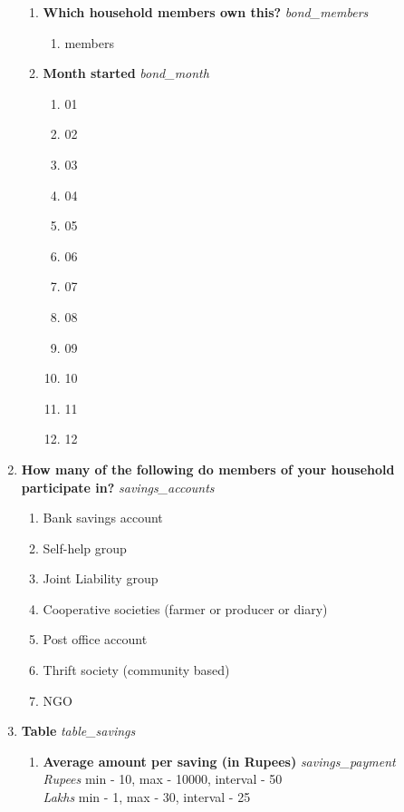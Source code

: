 \documentclass{article}
\begin{document}
\begin{enumerate}
\begin{enumerate}[label*=\arabic*.]
\item {\bfseries Which household members own this?}\emph{ bond\_members }
\begin{enumerate}
\item members
\end{enumerate}
\item {\bfseries Month started}\emph{ bond\_month }
\begin{enumerate}
\item 01
\item 02
\item 03
\item 04
\item 05
\item 06
\item 07
\item 08
\item 09
\item 10
\item 11
\item 12
\end{enumerate}
\end{enumerate}
\item {\bfseries How many of the following do members of your household participate in?}\emph{ savings\_accounts }
\begin{enumerate}
\item Bank savings account
\item Self-help group
\item Joint Liability group
\item Cooperative societies (farmer or producer or diary)
\item Post office account
\item Thrift society (community based)
\item NGO
\end{enumerate}
\item {\bfseries Table}\emph{ table\_savings }
\begin{enumerate}[label*=\arabic*.]
\item {\bfseries Average amount per saving (in Rupees)}\emph{ savings\_payment }
\\ \emph{ Rupees }min - 10, max - 10000, interval - 50
\\ \emph{ Lakhs }min - 1, max - 30, interval - 25


\end{enumerate}
\end{enumerate}
\end{document}
